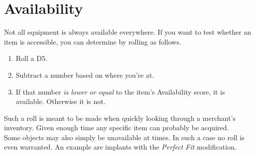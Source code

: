 \section{Availability}
\label{sec:availability}
Not all equipment is always available everywhere.
If you want to test whether an item is accessible,
	you can determine by rolling as follows.
\par
\begin{enumerate}
	\vspace{-10mm}
	\setlength\itemsep{-10mm}
	\item Roll a D5.
	\item Subtract a number based on where you’re at.
	\item If that number \emph{is lower or equal} to the item's Availability score, it is available.
	Otherwise it is not.
\end{enumerate}
\par
Such a roll is meant to be made when quickly looking through a merchant's inventory.
Given enough time any specific item can probably be acquired.
\\%
Some objects may also simply be unavailable at times.
In such a case no roll is even warranted.
An example are implants with the \emph{Perfect Fit} modification.